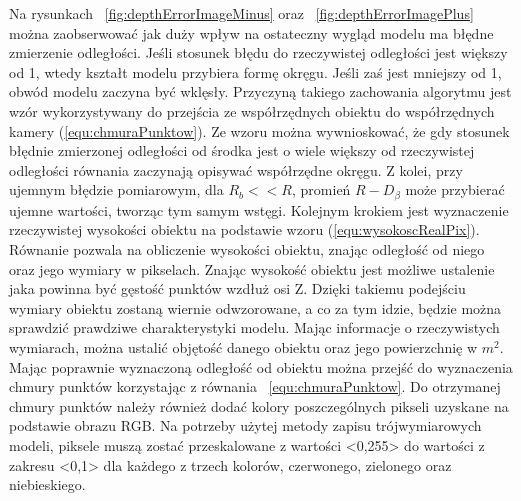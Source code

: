 Na rysunkach ~\ref{fig:depthErrorImageMinus} oraz ~\ref{fig:depthErrorImagePlus} można zaobserwować jak duży wpływ na ostateczny wygląd modelu ma błędne zmierzenie odległości. Jeśli stosunek błędu do rzeczywistej odległości jest większy od 1, wtedy kształt modelu przybiera formę okręgu. Jeśli zaś jest mniejszy od 1, obwód modelu zaczyna być wklęsły. Przyczyną takiego zachowania algorytmu jest wzór wykorzystywany do przejścia ze współrzędnych obiektu do współrzędnych kamery (\ref{equ:chmuraPunktow}). Ze wzoru można wywnioskować, że gdy stosunek błędnie zmierzonej odległości od środka jest o wiele większy od rzeczywistej odległości równania zaczynają opisywać współrzędne okręgu. Z kolei, przy ujemnym błędzie pomiarowym, dla $R_{b}<<R$, promień $R-D_{\beta}$ może przybierać ujemne wartości, tworząc tym samym wstęgi.
\newline \indent Kolejnym krokiem jest wyznaczenie rzeczywistej wysokości obiektu na podstawie wzoru (\ref{equ:wysokoscRealPix}). Równanie pozwala na obliczenie wysokości obiektu, znając odległość od niego oraz jego wymiary w pikselach. Znając wysokość obiektu jest możliwe ustalenie jaka powinna być gęstość punktów wzdłuż osi Z. Dzięki takiemu podejściu wymiary obiektu zostaną wiernie odwzorowane, a co za tym idzie, będzie można sprawdzić prawdziwe charakterystyki modelu. Mając informacje o rzeczywistych wymiarach, można ustalić objętość danego obiektu oraz jego powierzchnię w $m^2$.
\newline \indent Mając poprawnie wyznaczoną odległość od obiektu można przejść do wyznaczenia chmury punktów korzystając z równania ~\ref{equ:chmuraPunktow}. Do otrzymanej chmury punktów należy również dodać kolory poszczególnych pikseli uzyskane na podstawie obrazu RGB. Na potrzeby użytej metody zapisu trójwymiarowych modeli, piksele muszą zostać przeskalowane z wartości <0,255> do wartości z zakresu <0,1> dla każdego z trzech kolorów, czerwonego, zielonego oraz niebieskiego.
